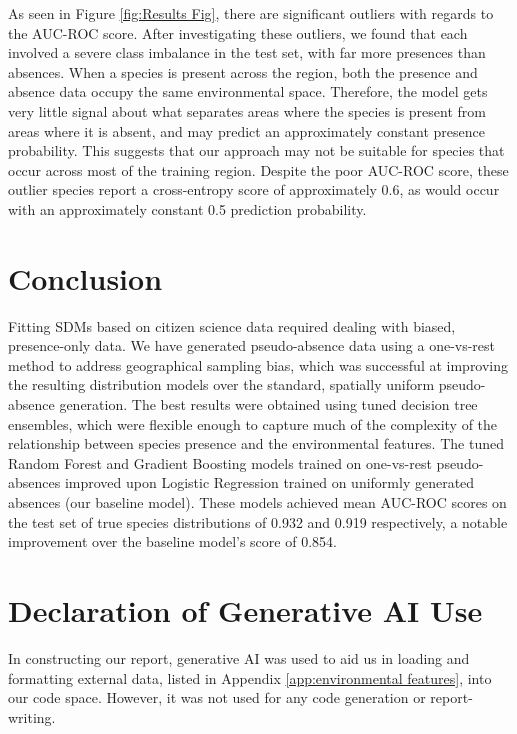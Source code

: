 \documentclass{article}
\begin{document}
As seen in Figure \ref{fig:Results Fig}, there are significant outliers with regards to the AUC-ROC score. After investigating these outliers, we found that each involved a severe class imbalance in the test set, with far more presences than absences. 
When a species is present across the region, both the presence and absence data occupy the same environmental space. Therefore, the model gets very little signal about what separates areas where the species is present from areas where it is absent, and may predict an approximately constant presence probability. This suggests that our approach may not be suitable for species that occur across most of the training region. Despite the poor AUC-ROC score, these outlier species report a cross-entropy score of approximately 0.6, as would occur with an approximately constant 0.5 prediction probability.
\vspace{-0.4em}

\section{Conclusion}\vspace{-0.4em}
Fitting SDMs based on citizen science data required dealing with biased, presence-only data. We have generated pseudo-absence data using a one-vs-rest method to address geographical sampling bias, which was successful at improving the resulting distribution models over the standard, spatially uniform pseudo-absence generation. The best results were obtained using tuned decision tree ensembles, which were flexible enough to capture much of the complexity of the relationship between species presence and the environmental features. The tuned Random Forest and Gradient Boosting models trained on one-vs-rest pseudo-absences improved upon Logistic Regression trained on uniformly generated absences (our baseline model). These models achieved mean AUC-ROC scores on the test set of true species distributions of 0.932 and 0.919 respectively, a notable improvement over the baseline model's score of 0.854.
\newpage
\section*{Declaration of Generative AI Use}
In constructing our report, generative AI was used to aid us in loading and formatting external data, listed in Appendix \ref{app:environmental features}, into our code space. However, it was not used for any code generation or report-writing. 
\end{document}
